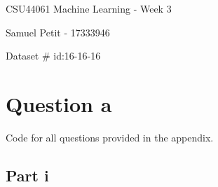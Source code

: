 \documentclass[10pt]{article}
\begin{document}
{\centering
    CSU44061 Machine Learning - Week 3
    \par
    Samuel Petit - 17333946
    \par
    Dataset \# id:16-16-16  
    \par
}
\section*{Question a}
Code for all questions provided in the appendix.
\subsection*{Part i}

\begin{lstlisting}
\end{lstlisting}
\end{document}
